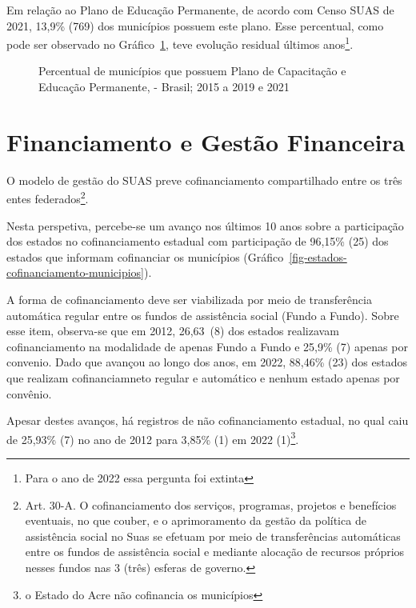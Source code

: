 \documentclass[
  letterpaper,
  DIV=11,
  numbers=noendperiod]{scrreprt}
\begin{document}
Em relação ao Plano de Educação Permanente, de acordo com Censo SUAS de
2021, 13,9\% (769) dos municípios possuem este plano. Esse percentual,
como pode ser observado no Gráfico~\ref{fig-PNEP_Munic}, teve evolução
residual últimos anos\footnote{Para o ano de 2022 essa pergunta foi
  extinta}.

\begin{figure}


\caption{\label{fig-PNEP_Munic}Percentual de municípios que possuem
Plano de Capacitação e Educação Permanente, - Brasil; 2015 a 2019 e
2021}

\end{figure}%

\section{Financiamento e Gestão
Financeira}\label{financiamento-e-gestuxe3o-financeira}

O modelo de gestão do SUAS preve cofinanciamento compartilhado entre os
três entes federados\footnote{Art. 30-A. O cofinanciamento dos serviços,
  programas, projetos e benefícios eventuais, no que couber, e o
  aprimoramento da gestão da política de assistência social no Suas se
  efetuam por meio de transferências automáticas entre os fundos de
  assistência social e mediante alocação de recursos próprios nesses
  fundos nas 3 (três) esferas de governo.}.

Nesta perspetiva, percebe-se um avanço nos últimos 10 anos sobre a
participação dos estados no cofinanciamento estadual com participação de
96,15\% (25) dos estados que informam cofinanciar os municípios
(Gráfico~\ref{fig-estados-cofinanciamento-municipios}).

A forma de cofinanciamento deve ser viabilizada por meio de
transferência automática regular entre os fundos de assistência social
(Fundo a Fundo). Sobre esse item, observa-se que em 2012, 26,63\        (8)
dos estados realizavam cofinanciamento na modalidade de apenas Fundo a
Fundo e 25,9\% (7) apenas por convenio. Dado que avançou ao longo dos
anos, em 2022, 88,46\% (23) dos estados que realizam cofinanciamneto
regular e automático e nenhum estado apenas por convênio.

Apesar destes avanços, há registros de não cofinanciamento estadual, no
qual caiu de 25,93\% (7) no ano de 2012 para 3,85\% (1) em 2022
(1)\footnote{o Estado do Acre não cofinancia os municípios}.
\end{document}
